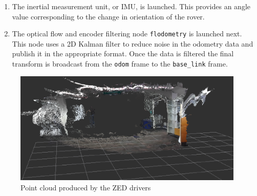 \documentclass[10pt, oneside,onecolumn]{IEEEtran}
\begin{document}
\begin{enumerate}
\item The inertial measurement unit, or IMU, is launched. This provides an angle value corresponding to the change in orientation of the rover. 

\item The optical flow and encoder filtering node \texttt{flodometry} is launched next. This node uses a 2D Kalman filter to reduce noise in the odometry data and publish it in the appropriate format. Once the data is filtered the final transform is broadcast from the \texttt{odom} frame to the \texttt{base\_link} frame.
\end{enumerate}

\begin{figure}[H]
\centering
\includegraphics[width=110mm]{newpc2.eps}
\caption{Point cloud produced by the ZED drivers \label{overflow}}
\end{figure}
\end{document}

